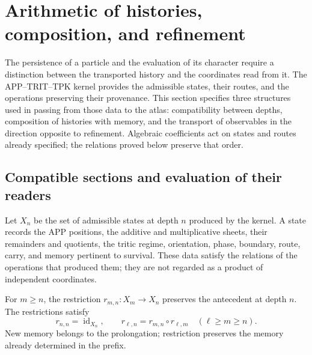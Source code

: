 \section{Arithmetic of histories, composition, and refinement}
\label{vi:vi:hist:seccion-principal}

The persistence of a particle and the evaluation of its character require
a distinction between the transported history and the coordinates read from it.
The APP--TRIT--TPK kernel provides the admissible states, their routes, and
the operations preserving their provenance. This section specifies three
structures used in passing from those data to the atlas: compatibility
between depths, composition of histories with memory, and the
transport of observables in the direction opposite to refinement.
Algebraic coefficients act on states and routes already specified;
the relations proved below preserve that order.

\subsection{Compatible sections and evaluation of their readers}
\label{vi:hist:seccion}

Let \(X_n\) be the set of admissible states at depth \(n\)
produced by the kernel. A state records the APP positions, the
additive and multiplicative sheets, their remainders and quotients, the tritic
regime, orientation, phase, boundary, route, carry, and
memory pertinent to survival. These data satisfy the
relations of the operations that produced them; they are not regarded as a
product of independent coordinates.

For \(m\ge n\), the restriction
\(r_{m,n}:X_m\longrightarrow X_n\) preserves the antecedent at depth
\(n\). The restrictions satisfy
\begin{equation}
 r_{n,n}=\operatorname{id}_{X_n},\qquad
 r_{\ell,n}=r_{m,n}\circ r_{\ell,m}
 \quad(\ell\ge m\ge n).
 \label{vi:vi:hist:restricciones}
\end{equation}
New memory belongs to the prolongation; restriction preserves the memory
already determined in the prefix.

